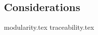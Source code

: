 \documentclass{article}
\begin{document}
\subsection{Considerations}

{modularity.tex}
{traceability.tex}
\end{document}
